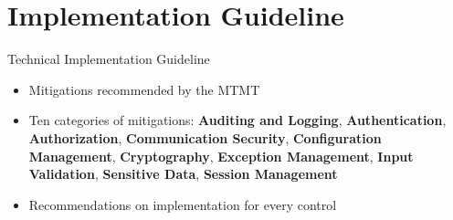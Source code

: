 \documentclass[xcolor=table]{beamer}
\begin{document}

\section{Implementation Guideline}

\begin{frame}{Technical Implementation Guideline}
\begin{itemize}
    \item Mitigations recommended by the MTMT
    \item Ten categories of mitigations: \textbf{Auditing and Logging}, \textbf{Authentication}, \textbf{Authorization}, \textbf{Communication Security}, \textbf{Configuration Management}, \textbf{Cryptography}, \textbf{Exception Management}, \textbf{Input Validation}, \textbf{Sensitive Data}, \textbf{Session Management}
    \item Recommendations on implementation for every control
    
\end{itemize}
\end{frame}
\end{document}
